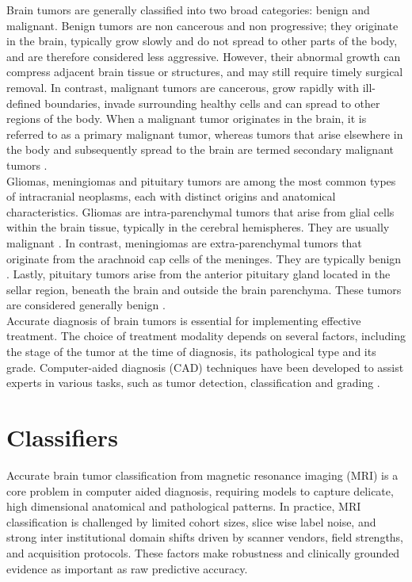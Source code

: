 Brain tumors are generally classified into two broad categories: benign and malignant. Benign tumors are non cancerous and non progressive; they originate in the brain, typically grow slowly and do not spread to other parts of the body, and are therefore considered less aggressive. However, their abnormal growth can compress adjacent brain tissue or structures, and may still require timely surgical removal. In contrast, malignant tumors are cancerous, grow rapidly with ill-defined boundaries, invade surrounding healthy cells and can spread to other regions of the body. When a malignant tumor originates in the brain, it is referred to as a primary malignant tumor, whereas tumors that arise elsewhere in the body and subsequently spread to the brain are termed secondary malignant tumors \cite{Rehman2020}.\\

Gliomas, meningiomas and pituitary tumors are among the most common types of intracranial neoplasms, each with distinct origins and anatomical characteristics. Gliomas are intra-parenchymal tumors that arise from glial cells within the brain tissue, typically in the cerebral hemispheres. They are usually malignant \cite{hernandez2022immunoprofiling}. In contrast, meningiomas are extra-parenchymal tumors that originate from the arachnoid cap cells of the meninges. They are typically benign \cite{cao2023hemorrhagic}. Lastly, pituitary tumors arise from the anterior pituitary gland located in the sellar region, beneath the brain and outside the brain parenchyma. These tumors are considered generally benign \cite{wijethilake2023imaging}.\\

Accurate diagnosis of brain tumors is essential for implementing effective treatment. The choice of treatment modality depends on several factors, including the stage of the tumor at the time of diagnosis, its pathological type and its grade. Computer-aided diagnosis (CAD) techniques have been developed to assist experts in various tasks, such as tumor detection, classification and grading \cite{deepak2019brain}. 

\section{Classifiers}

Accurate brain tumor classification from magnetic resonance imaging (MRI) is a core problem in computer aided diagnosis, requiring models to capture delicate, high dimensional anatomical and pathological patterns. In practice, MRI classification is challenged by limited cohort sizes, slice wise label noise, and strong inter institutional domain shifts driven by scanner vendors, field strengths, and acquisition protocols. These factors make robustness and clinically grounded evidence as important as raw predictive accuracy.\\

